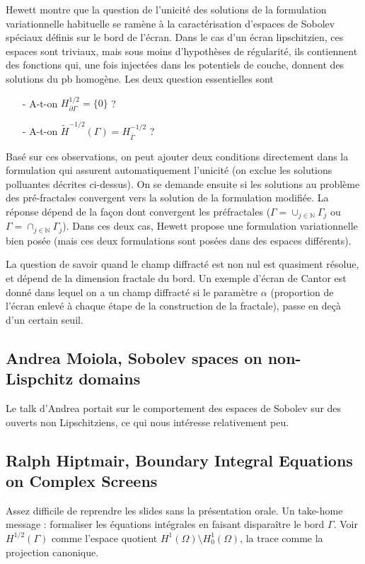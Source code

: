 \documentclass[11pt,a4paper]{article}
\begin{document}
Hewett montre que la question de l'unicité des solutions de la formulation variationnelle habituelle se ramène à la caractérisation d'espaces de Sobolev spéciaux définis sur le bord de l'écran. Dans le cas d'un écran lipschitzien, ces espaces sont triviaux, mais sous moins d'hypothèses de régularité, ils contiennent des fonctions qui, une fois injectées dans les potentiels de couche, donnent des solutions du pb homogène. Les deux question essentielles sont 
\begin{itemize}
\item[-] A-t-on $H_{\partial \Gamma}^{1/2} = \{0\}$ ? 
\item[-] A-t-on $\tilde{H}^{-1/2}(\Gamma) = H^{-1/2}_{\overline{\Gamma}}$ ? 
\end{itemize}
Basé sur ces observations, on peut ajouter deux conditions directement dans la formulation qui assurent automatiquement l'unicité (on exclue les solutions polluantes décrites ci-dessus). 
On se demande ensuite si les solutions au problème des pré-fractales convergent vers la solution de la formulation modifiée. La réponse dépend de la façon dont convergent les préfractales ($\Gamma = \cup_{j\in \mathbb{N}} \Gamma_j$ ou $\Gamma = \cap_{j\in \mathbb{N}} \Gamma_j$). Dans ces deux cas, Hewett propose une formulation variationnelle bien posée (mais ces deux formulations sont posées dans des espaces différents). 

La question de savoir quand le champ diffracté est non nul est quasiment résolue, et dépend de la dimension fractale du bord. Un exemple d'écran de Cantor est donné dans lequel on a un champ diffracté si le paramètre $\alpha$ (proportion de l'écran enlevé à chaque étape de la construction de la fractale), passe en deçà d'un certain seuil. 

\subsection{Andrea Moiola, Sobolev spaces on non-Lispchitz domains}

Le talk d'Andrea portait sur le comportement des espaces de Sobolev sur des ouverts non Lipschitziens, ce qui nous intéresse relativement peu. 

\subsection{Ralph Hiptmair, Boundary Integral Equations on Complex Screens} 

Assez difficile de reprendre les slides sans la présentation orale. Un take-home message : formaliser les équations intégrales en faisant disparaître le bord $\Gamma$. Voir $H^{1/2}(\Gamma)$ comme l'espace quotient $H^{1}(\Omega)\setminus H^{1}_0(\Omega)$, la trace comme la projection canonique. 
\end{document}
